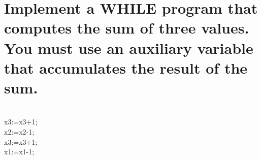 \documentclass{article}
\theoremstyle{plain}
\theoremstyle{definition}
\begin{document}
\begin{center}
\end{center}
\section {Implement a WHILE program that computes the sum of three values. You must use an auxiliary variable that accumulates the result of the sum.}


\begin{algorithmic}

	\\\hspace{1cm}x3:=x3+1;
	\\\hspace{1cm}x2:=x2-1;\hspace{1cm}
\EndWhile
\vspace{0.15cm}
\\\hspace{0.5cm}x3:=x3+1;
\\\hspace{0.5cm}x1:=x1-1;
\vspace{0.15cm}
\EndWhile

\end{algorithmic}
\end{document}
